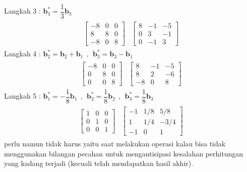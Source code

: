 \documentclass{article}   %
\begin{document}
Langkah 3 : $\textbf{b}^*_3= \dfrac{1}{3}\textbf{b}_3$ \\
\begin{align*}
	\begin{array}{r|r} 
		\left[
		\begin{array}{rrr} 
			-8 & 0 & 0\\
			8 & 8 & 0\\
			-8 &0 & 8 
		\end{array} 
		\right]  & \left[
		\begin{array}{rrr} 
			8 & -1 & -5\\
			0 & 3 & -1\\
			0 &-1 & 3 
		\end{array} 
		\right]
	\end{array}
\end{align*}
Langkah 4 : $\textbf{b}^*_2= \textbf{b}_2 + \textbf{b}_1~~,~~\textbf{b}^*_3= \textbf{b}_3 - \textbf{b}_1$ \\
\begin{align*}
	\begin{array}{r|r} 
		\left[
		\begin{array}{rrr} 
			-8 & 0 & 0\\
			0 & 8 & 0\\
			0 &0 & 8 
		\end{array} 
		\right]  & \left[
		\begin{array}{rrr} 
			8 & -1 & -5\\
			8 & 2 & -6\\
			-8 &0 & 8 
		\end{array} 
		\right]
	\end{array}
\end{align*}
Langkah 5 : $\textbf{b}^*_1= -\dfrac{1}{8}\textbf{b}_1~~,~~\textbf{b}^*_2= \dfrac{1}{8}\textbf{b}_2~~,~~\textbf{b}^*_3= \dfrac{1}{8}\textbf{b}_3$ \\
\begin{align*}
	\begin{array}{r|r} 
		\left[
		\begin{array}{rrr} 
			1 & 0 & 0\\
			0 & 1 & 0\\
			0 &0 & 1 
		\end{array} 
		\right]  & \left[
		\begin{array}{rrr} 
			-1 & 1/8 & 5/8\\
			1 & 1/4 & -3/4\\
			-1 &0 & 1 
		\end{array} 
		\right]
	\end{array}
\end{align*}
perlu namun tidak harus yaitu saat melakukan operasi kalau bisa tidak menggunakan bilangan pecahan untuk mengantisipasi kesalahan perhitungan yang kadang terjadi (kecuali telah mendapatkan hasil akhir).
\end{document}
